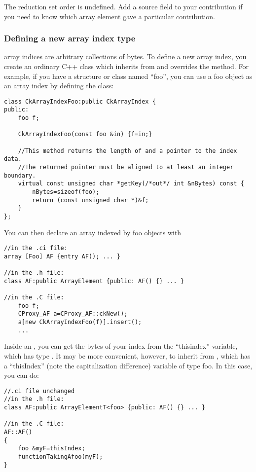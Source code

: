 The reduction set order is undefined.  Add a source field to your contribution if you need to know which array element gave a particular contribution.

\subsubsection{Defining a new array index type}
\charmpp array indices are arbitrary collections of bytes.
To define a new array index, you create an ordinary C++ class 
which inherits from  and overrides the  method.  
For example, if you have a structure or class named ``foo'', you 
can use a foo object as an array index by defining the class:

\begin{verbatim}
class CkArrayIndexFoo:public CkArrayIndex {
public:
    foo f;

    CkArrayIndexFoo(const foo &in) {f=in;}

    //This method returns the length of and a pointer to the index data.
    //The returned pointer must be aligned to at least an integer boundary.
    virtual const unsigned char *getKey(/*out*/ int &nBytes) const {
      	nBytes=sizeof(foo);
        return (const unsigned char *)&f;
    }
};
\end{verbatim}

You can then declare an array indexed by foo objects with

\begin{verbatim}
//in the .ci file:
array [Foo] AF {entry AF(); ... }

//in the .h file:
class AF:public ArrayElement {public: AF() {} ... }

//in the .C file:
    foo f;
    CProxy_AF a=CProxy_AF::ckNew();
    a[new CkArrayIndexFoo(f)].insert();
    ...
\end{verbatim}

Inside an , you can get the bytes of your index
from the ``thisindex'' variable, which has type .  
It may be more convenient, however, to inherit from , 
which has a ``thisIndex'' (note the capitalization
difference) variable of type foo.  In this case, you can do:

\begin{verbatim}
//.ci file unchanged
//in the .h file:
class AF:public ArrayElementT<foo> {public: AF() {} ... }

//in the .C file:
AF::AF()
{
    foo &myF=thisIndex;
    functionTakingAfoo(myF);
}
\end{verbatim}


